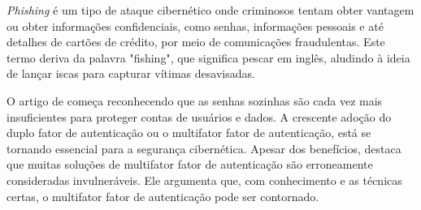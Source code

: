 \documentclass[12pt]{article}
\begin{document}
\textit{Phishing} é um tipo de ataque cibernético onde criminosos tentam obter
vantagem ou obter informações confidenciais, como senhas, informações
pessoais e até detalhes de cartões de crédito, por meio de comunicações
fraudulentas.
Este termo deriva da palavra "fishing", que significa pescar em inglês,
aludindo à ideia de lançar iscas para capturar vítimas desavisadas.

O artigo de \cite{article:3} começa reconhecendo que as senhas sozinhas são cada vez mais
insuficientes para proteger contas de usuários e dados.
A crescente adoção do duplo fator de autenticação ou o multifator fator de autenticação, está
se tornando essencial para a segurança cibernética.
Apesar dos benefícios, \cite{article:3} destaca que muitas soluções de multifator fator de
autenticação são erroneamente consideradas invulneráveis.
Ele argumenta que, com conhecimento e as técnicas certas, o multifator fator de autenticação
pode ser contornado.
\end{document}

